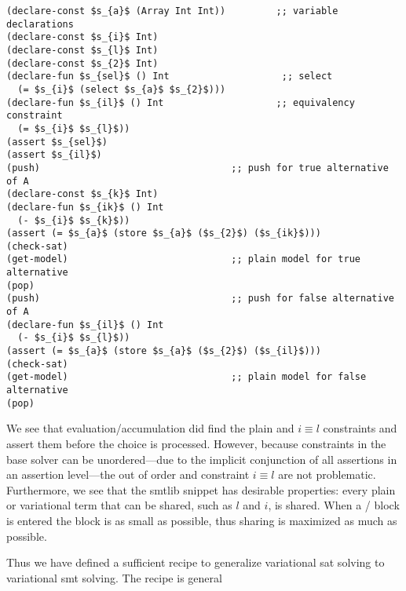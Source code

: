 \begin{lstlisting}[columns=flexible,keepspaces=true,language=SMTLIB,breaklines=true]
(declare-const $s_{a}$ (Array Int Int))         ;; variable declarations
(declare-const $s_{i}$ Int)
(declare-const $s_{l}$ Int)
(declare-const $s_{2}$ Int)
(declare-fun $s_{sel}$ () Int                    ;; select
  (= $s_{i}$ (select $s_{a}$ $s_{2}$)))
(declare-fun $s_{il}$ () Int                    ;; equivalency constraint
  (= $s_{i}$ $s_{l}$))
(assert $s_{sel}$)
(assert $s_{il}$)
(push)                                  ;; push for true alternative of A
(declare-const $s_{k}$ Int)
(declare-fun $s_{ik}$ () Int
  (- $s_{i}$ $s_{k}$))
(assert (= $s_{a}$ (store $s_{a}$ ($s_{2}$) ($s_{ik}$)))
(check-sat)
(get-model)                             ;; plain model for true alternative
(pop)
(push)                                  ;; push for false alternative of A
(declare-fun $s_{il}$ () Int
  (- $s_{i}$ $s_{l}$))
(assert (= $s_{a}$ (store $s_{a}$ ($s_{2}$) ($s_{il}$)))
(check-sat)
(get-model)                             ;; plain model for false alternative
(pop)
\end{lstlisting}
%
We see that evaluation/accumulation did find the plain \select{} and $i \equiv
l$ constraints and assert them before the choice is processed. However, because
constraints in the base solver can be unordered---due to the implicit
conjunction of all assertions in an assertion level---the out of order \select{}
and constraint $i \equiv l$ are not problematic. Furthermore, we see that the
\acl{smtlib} snippet has desirable properties: every plain or variational term
that can be shared, such as $l$ and $i$, is shared. When a /
block is entered the block is as small as possible, thus sharing is maximized as
much as possible.

Thus we have defined a sufficient recipe to generalize variational \ac{sat}
solving to variational \ac{smt} solving. The recipe is general

